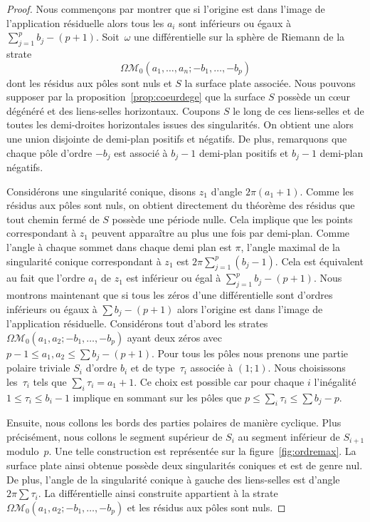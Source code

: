 \documentclass[11pt]{article}
\numberwithin{equation}{section}\renewcommand{\proofname}{Démonstration}
\let\mathcal\mathscr
\newcommand{\omoduli}[1][g]{{\Omega\mathcal M}_{\!#1}}
\theoremstyle{definition}
\begin{document}
\begin{proof}
Nous commençons par montrer que si l'origine est dans l'image de l'application résiduelle alors tous les $a_{i}$ sont inférieurs ou égaux à $\sum_{j=1}^p b_{j}-(p+1)$.
Soit~$\omega$ une différentielle sur la sphère de Riemann de la strate
\[
\omoduli[0](a_{1},\dots,a_{n};-b_{1},\dots,-b_{p})
\]
dont les résidus aux pôles sont nuls et $S$ la surface plate associée. Nous pouvons supposer par la proposition~\ref{prop:coeurdege} que la surface $S$ possède un cœur dégénéré et des liens-selles horizontaux. Coupons $S$ le long de ces liens-selles et de toutes les demi-droites horizontales issues des singularités. On obtient une alors une union disjointe de demi-plan positifs et négatifs. De plus, remarquons que chaque pôle d'ordre $-b_{j}$ est associé à $b_{j}-1$ demi-plan positifs et $b_{j}-1$ demi-plan négatifs.

Considérons une singularité conique, disons $z_{1}$ d'angle $2\pi(a_{1}+1)$. Comme les résidus aux pôles sont nuls, on obtient directement du théorème des résidus que tout chemin fermé de $S$ possède une période nulle.
Cela implique que les points correspondant à $z_{1}$ peuvent apparaître au plus une fois par demi-plan.
Comme l'angle à chaque sommet dans chaque demi plan est $\pi$, l'angle maximal de la singularité conique correspondant à $z_{1}$ est $2\pi\sum_{j=1}^p (b_{j}-1)$. Cela est équivalent au fait que l'ordre $a_{1}$ de $z_{1}$ est inférieur ou égal à $\sum_{j=1}^p b_{j}-(p+1)$.
Nous montrons maintenant que si tous les zéros d'une différentielle sont d'ordres inférieurs ou égaux à $\sum b_{j}-(p+1)$ alors l'origine est dans l'image de l'application résiduelle.
Considérons tout d'abord les strates $\omoduli[0]\left(a_{1},a_{2};-b_{1},\dots,-b_{p}\right)$ ayant deux zéros avec $p-1\leq a_{1},a_{2}\leq \sum b_{j} -(p+1)$. Pour tous les pôles nous prenons une partie polaire triviale $S_{i}$ d'ordre $b_{i}$ et de type~$\tau_{i}$ associée à $(1;1)$. Nous choisissons les~$\tau_{i}$ tels que $\sum_{i}\tau_{i}=a_{1}+1$. Ce choix est possible car pour chaque $i$ l'inégalité $1\leq \tau_{i} \leq b_{i}-1$ implique en sommant sur les pôles que $p\leq\sum_{i}\tau_{i}\leq \sum b_{j}-p$.

Ensuite, nous collons les bords des parties polaires de manière cyclique. Plus précisément, nous collons le segment supérieur de $S_{i}$ au segment inférieur de $S_{i+1}$ modulo~$p$. Une telle construction est représentée sur la figure~\ref{fig:ordremax}. La surface plate ainsi obtenue possède deux singularités coniques et est de genre nul. De plus, l'angle de la singularité conique à gauche des liens-selles est d'angle $2\pi\sum \tau_{i}$. La différentielle ainsi construite appartient à la strate $\omoduli[0]\left(a_{1},a_{2};-b_{1},\dots,-b_{p}\right)$ et les résidus aux pôles sont nuls.


\end{proof}
\end{document}
